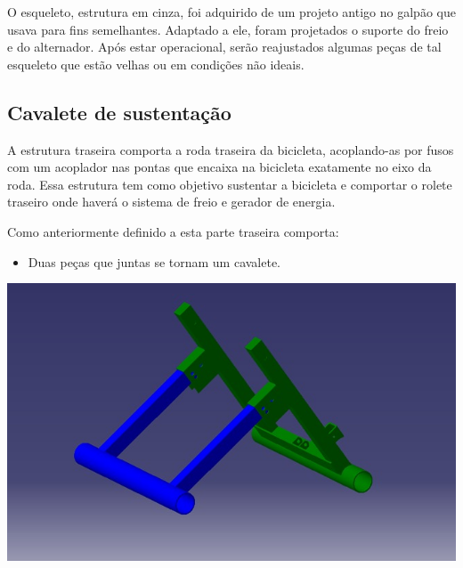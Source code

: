     O esqueleto, estrutura em cinza, foi adquirido de um projeto antigo no galpão que usava para fins semelhantes. Adaptado a ele, foram projetados o suporte do freio e do alternador. Após estar operacional, serão reajustados algumas peças de tal esqueleto que estão velhas ou em condições não ideais.

\subsection{Cavalete de sustentação}

    A estrutura traseira comporta a roda traseira da bicicleta, acoplando-as por fusos com um acoplador nas pontas que encaixa na bicicleta exatamente no eixo da roda. Essa estrutura tem como objetivo sustentar a bicicleta e comportar o rolete traseiro onde haverá o sistema de freio e gerador de energia.

    Como anteriormente definido a esta parte traseira comporta:
    \begin{itemize}
        \item Duas peças que juntas se tornam um cavalete.
    \end{itemize}
    
    \begin{center}
    	\includegraphics[scale=0.7]{figuras/esquema_traseira_1}
        \label{esquema_traseira_1}
    \end{center}    

